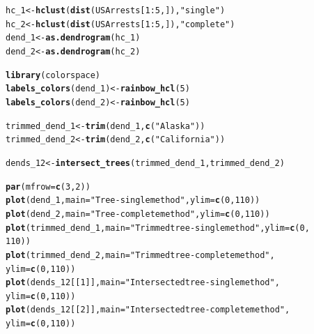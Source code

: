 \documentclass[shortnames,nojss,article]{jss}\usepackage[]{graphicx}\usepackage[]{color}
\makeatletter
\newcommand{\hlnum}[1]{\textcolor[rgb]{0.686,0.059,0.569}{#1}}%
\newcommand{\hlstr}[1]{\textcolor[rgb]{0.192,0.494,0.8}{#1}}%
\newcommand{\hlopt}[1]{\textcolor[rgb]{0,0,0}{#1}}%
\newcommand{\hlstd}[1]{\textcolor[rgb]{0.345,0.345,0.345}{#1}}%
\newcommand{\hlkwb}[1]{\textcolor[rgb]{0.69,0.353,0.396}{#1}}%
\newcommand{\hlkwc}[1]{\textcolor[rgb]{0.333,0.667,0.333}{#1}}%
\newcommand{\hlkwd}[1]{\textcolor[rgb]{0.737,0.353,0.396}{\textbf{#1}}}%
\newenvironment{kframe}{%
 \def\at@end@of@kframe{}%
 \ifinner\ifhmode%
  \def\at@end@of@kframe{\end{minipage}}%
  \begin{minipage}{\columnwidth}%
 \fi\fi%
 \def\FrameCommand##1{\hskip\@totalleftmargin \hskip-\fboxsep
 \colorbox{shadecolor}{##1}\hskip-\fboxsep
     \hskip-\linewidth \hskip-\@totalleftmargin \hskip\columnwidth}%
 \MakeFramed {\advance\hsize-\width
   \@totalleftmargin\z@ \linewidth\hsize
   \@setminipage}}%
 {\par\unskip\endMakeFramed%
 \at@end@of@kframe}
\newenvironment{knitrout}{}{} %
\makeatother
\begin{document}
\begin{knitrout}
\color{fgcolor}\begin{kframe}
\begin{alltt}
\hlstd{hc_1} \hlkwb{<-} \hlkwd{hclust}\hlstd{(}\hlkwd{dist}\hlstd{(USArrests[}\hlnum{1}\hlopt{:}\hlnum{5}\hlstd{, ]),} \hlstr{"single"}\hlstd{)}
\hlstd{hc_2} \hlkwb{<-} \hlkwd{hclust}\hlstd{(}\hlkwd{dist}\hlstd{(USArrests[}\hlnum{1}\hlopt{:}\hlnum{5}\hlstd{, ]),} \hlstr{"complete"}\hlstd{)}
\hlstd{dend_1} \hlkwb{<-} \hlkwd{as.dendrogram}\hlstd{(hc_1)}
\hlstd{dend_2} \hlkwb{<-} \hlkwd{as.dendrogram}\hlstd{(hc_2}\hlstd{)}

\hlkwd{library}\hlstd{(colorspace)}
\hlkwd{labels_colors}\hlstd{(dend_1)} \hlkwb{<-} \hlkwd{rainbow_hcl}\hlstd{(}\hlnum{5}\hlstd{)}
\hlkwd{labels_colors}\hlstd{(dend_2)} \hlkwb{<-} \hlkwd{rainbow_hcl}\hlstd{(}\hlnum{5}\hlstd{)}


\hlstd{trimmed_dend_1} \hlkwb{<-} \hlkwd{trim}\hlstd{(dend_1,} \hlkwd{c}\hlstd{(}\hlstr{"Alaska"}\hlstd{))}
\hlstd{trimmed_dend_2} \hlkwb{<-} \hlkwd{trim}\hlstd{(dend_2,} \hlkwd{c}\hlstd{(}\hlstr{"California"}\hlstd{)}\hlstd{)}

\hlstd{dends_12} \hlkwb{<-} \hlkwd{intersect_trees}\hlstd{(trimmed_dend_1, trimmed_dend_2}\hlstd{)}

\hlkwd{par}\hlstd{(}\hlkwc{mfrow} \hlstd{=} \hlkwd{c}\hlstd{(}\hlnum{3}\hlstd{,} \hlnum{2}\hlstd{))}
\hlkwd{plot}\hlstd{(dend_1,} \hlkwc{main} \hlstd{=} \hlstr{"Tree - single method"}\hlstd{,} \hlkwc{ylim} \hlstd{=} \hlkwd{c}\hlstd{(}\hlnum{0}\hlstd{,} \hlnum{110}\hlstd{))}
\hlkwd{plot}\hlstd{(dend_2,} \hlkwc{main} \hlstd{=} \hlstr{"Tree - complete method"}\hlstd{,} \hlkwc{ylim} \hlstd{=} \hlkwd{c}\hlstd{(}\hlnum{0}\hlstd{,} \hlnum{110}\hlstd{))}
\hlkwd{plot}\hlstd{(trimmed_dend_1,} \hlkwc{main} \hlstd{=} \hlstr{"Trimmed tree - single method"}\hlstd{,} \hlkwc{ylim} \hlstd{=} \hlkwd{c}\hlstd{(}\hlnum{0}\hlstd{,}
    \hlnum{110}\hlstd{))}
\hlkwd{plot}\hlstd{(trimmed_dend_2,} \hlkwc{main} \hlstd{=} \hlstr{"Trimmed tree - complete method"}\hlstd{,}
    \hlkwc{ylim} \hlstd{=} \hlkwd{c}\hlstd{(}\hlnum{0}\hlstd{,} \hlnum{110}\hlstd{))}
\hlkwd{plot}\hlstd{(dends_12[[}\hlnum{1}\hlstd{]],} \hlkwc{main} \hlstd{=} \hlstr{"Intersected tree - single method"}\hlstd{,}
    \hlkwc{ylim} \hlstd{=} \hlkwd{c}\hlstd{(}\hlnum{0}\hlstd{,} \hlnum{110}\hlstd{))}
\hlkwd{plot}\hlstd{(dends_12[[}\hlnum{2}\hlstd{]],} \hlkwc{main} \hlstd{=} \hlstr{"Intersected tree - complete method"}\hlstd{,}
    \hlkwc{ylim} \hlstd{=} \hlkwd{c}\hlstd{(}\hlnum{0}\hlstd{,} \hlnum{110}\hlstd{))}
\end{alltt}
\end{kframe}


\end{knitrout}
\end{document}
